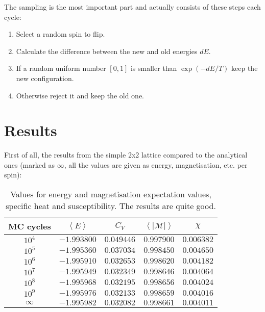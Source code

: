 \documentclass[11pt,a4paper,oneside]{article}
\begin{document}
		The sampling is the most important part and actually consists of these steps each cycle:\\
		
		\begin{enumerate}
			\item Select a random spin to flip.
			\item Calculate the difference between the new and old energies $dE$.
			\item If a random uniform number $\left[0,1\right]$ is smaller than $\exp{\left(-dE/T\right)}$ keep the new configuration.
			\item Otherwise reject it and keep the old one.
		\end{enumerate}
		
	\section{Results}

		First of all, the results from the simple 2x2 lattice compared to the analytical ones (marked as $\infty$, all the values are given as energy, magnetisation, etc. per spin):\vspace{3 cm}
		
		\begin{table}[ht!]\begin{center}\begin{tabular}{|c|c|c|c|c|}
			\hline MC cycles & $\left<E\right>$ & $C_V$ & $\left<\left|\mathcal{M}\right|\right>$ & $\chi$\\ 
			\hline $10^4$ & $-1.993800$ & $0.049446$ & $0.997900$ & $0.006382$\\ 
			\hline $10^5$ & $-1.995360$ & $0.037034$ & $0.998450$ & $0.004650$\\ 
			\hline $10^6$ & $-1.995910$ & $0.032653$ & $0.998620$ & $0.004182$\\ 
			\hline $10^7$ & $-1.995949$ & $0.032349$ & $0.998646$ & $0.004064$\\ 
			\hline $10^8$ & $-1.995968$ & $0.032195$ & $0.998656$ & $0.004024$\\ 
			\hline $10^9$ & $-1.995976$ & $0.032133$ & $0.998659$ & $0.004016$\\ 
			\hline $\infty$ & $-1.995982$ & $0.032082$ & $0.998661$ & $0.004011$\\
			\hline
		\end{tabular}\protect\caption{\scriptsize Values for energy and magnetisation expectation values, specific heat and susceptibility. The results are quite good.}\end{center}\end{table}\vspace{3 cm}
		
\end{document}
